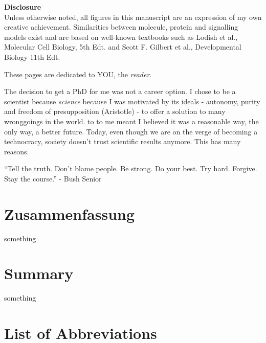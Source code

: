 \documentclass[11pt,singlespacinge,twoside]{reedthesis} %
\begin{document}
  \listoffigures
  \vfill
  \begin{center}
    \textbf{Disclosure}\\
    {Unless otherwise noted, all figures in this manuscript are an expression of my own creative achievement. Similarities between molecule, protein and signalling models exist and are based on well-known textbooks such as Lodish et al., Molecular Cell Biology, 5th Edt. and Scott F. Gilbert et al., Developmental Biology 11th Edt.}
  \end{center}
  \begin{dedication}
    These \pageref{LastPage} pages are dedicated to YOU, the \emph{reader}.\newline
    
    The decision to get a PhD for me was not a career option. I chose to be a scientist because \emph{science} because I was motivated by its ideals - autonomy, purity and freedom of presupposition (Aristotle) - to offer a solution to many wronggoings in the world. to to me meant I believed it was a reasonable way, the only way, a better future. Today, even though we are on the verge of becoming a technocracy, society doesn't trust scientific results anymore. This has many reasons.\newline
    
    ``Tell the truth. Don't blame people. Be strong. Do your best. Try hard. Forgive. Stay the course.'' - Bush Senior
  \end{dedication}
\mainmatter %
\pagestyle{fancyplain} %

\hypertarget{zusammenfassung}{%
\chapter*{Zusammenfassung}\label{zusammenfassung}}

something

\hypertarget{summary}{%
\chapter*{Summary}\label{summary}}

something

\hypertarget{list-of-abbreviations}{%
\chapter*{List of Abbreviations}\label{list-of-abbreviations}}
\end{document}

